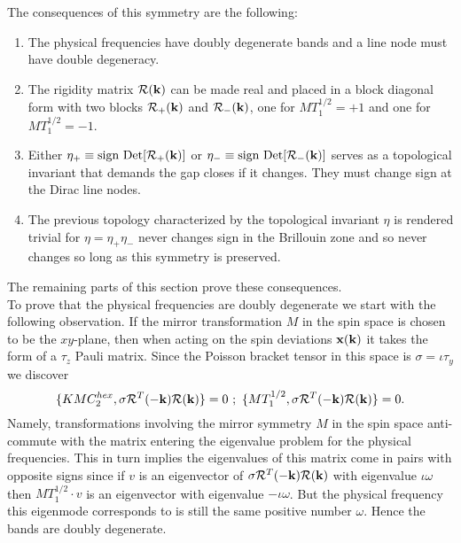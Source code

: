 \documentclass[a4paper,aps,prl,floatfix,showpacs,superscriptaddress,notitlepage]{revtex4-1}
\begin{document}
The consequences of this symmetry are the following:

\begin{enumerate}
\item The physical frequencies have doubly degenerate bands and a line node must have double degeneracy.
\item The rigidity matrix ${\mathcal R}({\bf k})$ can be made real and placed in a block diagonal form with two blocks ${\mathcal R}_+({\bf k})$ and ${\mathcal R}_-({\bf k})$, one for $MT_1^{1/2} = +1$ and one for $MT_1^{1/2}=-1$.
\item Either $\eta_+ \equiv \text{sign}\ \text{Det} [{\mathcal R}_+({\bf k})]$ or $\eta_- \equiv \text{sign}\ \text{Det} [{\mathcal R}_-({\bf k})]$ serves as a topological invariant that demands the gap closes if it changes. They must change sign at the Dirac line nodes.
\item The previous topology characterized by the topological invariant $\eta$ is rendered trivial for $\eta=\eta_+\eta_-$ never changes sign in the Brillouin zone and so never changes so long as this symmetry is preserved.
\end{enumerate}


The remaining parts of this section prove these consequences.\\

To prove that the physical frequencies are doubly degenerate we start with the following observation. If the mirror transformation $M$ in the spin space is chosen to be the $xy$-plane, then when acting on the spin deviations ${\bf x}({\bf k})$ it takes the form of a $\tau_z$ Pauli matrix. Since the Poisson bracket tensor in this space is $\sigma = \iota\tau_y$ we discover
\begin{equation}
  \{KMC_2^{hex}, {\bf{\sigma}} {\mathcal R}^T(-{\bf{k}}) {\mathcal R}({\bf{k}})\} = 0~;~
  \{MT_1^{1/2}, {\bf{\sigma}} {\mathcal R}^T(-{\bf{k}}) {\mathcal R}({\bf{k}})\} = 0. \nonumber
\end{equation}
Namely, transformations involving the mirror symmetry $M$ in the spin space anti-commute with the matrix entering the eigenvalue problem for the physical frequencies. This in turn implies the eigenvalues of this matrix come in pairs with opposite signs since if $v$ is an eigenvector of ${\bf{\sigma}} {\mathcal R}^T(-{\bf{k}}) {\mathcal R}({\bf{k}})$ with eigenvalue $\iota\omega$ then $MT_1^{1/2}\cdot v$ is an eigenvector with eigenvalue $-\iota\omega$. But the physical frequency this eigenmode corresponds to is still the same positive number $\omega$. Hence the bands are doubly degenerate.\\
\end{document}
